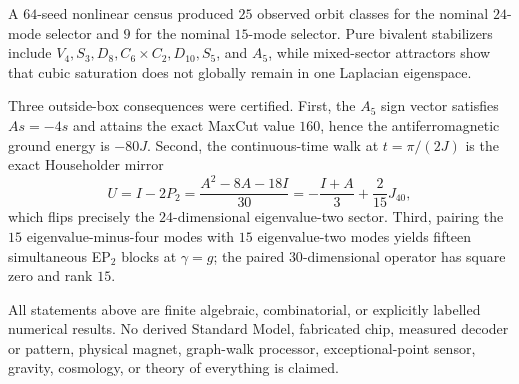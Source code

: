 A $64$-seed nonlinear census produced $25$ observed orbit classes for the nominal $24$-mode selector and $9$ for the nominal $15$-mode selector.  Pure bivalent stabilizers include $V_4,S_3,D_8,C_6\times C_2,D_{10},S_5$, and $A_5$, while mixed-sector attractors show that cubic saturation does not globally remain in one Laplacian eigenspace.

Three outside-box consequences were certified.  First, the $A_5$ sign vector satisfies $As=-4s$ and attains the exact MaxCut value $160$, hence the antiferromagnetic ground energy is $-80J$.  Second, the continuous-time walk at $t=\pi/(2J)$ is the exact Householder mirror
\[
U=I-2P_2=\frac{A^2-8A-18I}{30}=-\frac{I+A}{3}+\frac{2}{15}J_{40},
\]
which flips precisely the $24$-dimensional eigenvalue-two sector.  Third, pairing the $15$ eigenvalue-minus-four modes with $15$ eigenvalue-two modes yields fifteen simultaneous EP$_2$ blocks at $\gamma=g$; the paired $30$-dimensional operator has square zero and rank $15$.

All statements above are finite algebraic, combinatorial, or explicitly labelled numerical results.  No derived Standard Model, fabricated chip, measured decoder or pattern, physical magnet, graph-walk processor, exceptional-point sensor, gravity, cosmology, or theory of everything is claimed.
